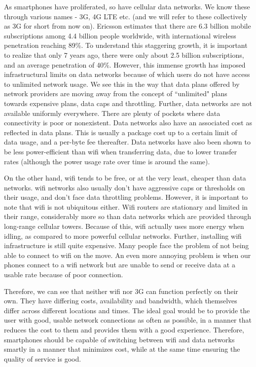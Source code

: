 \documentclass[12pt, fleqn]{article}
\begin{document}
As smartphones have proliferated,  so have cellular data networks. We know these through 
various names - 3G, 4G LTE etc. (and we will refer to these collectively as 3G for short from now on).
Ericsson estimates that there are 6.3 billion mobile subscriptions among 4.4 
billion people worldwide, with international wireless penetration reaching 89\%.\cite{ericsson-2013} To understand 
this staggering growth, it is important to realize that only 7 years ago, there 
were only about 2.5 billion subscriptions, and an average penetration of 
40\%.\cite{gsma-2006} However, this immense growth has imposed infrastructural limits on data networks because of 
which users do not have access to unlimited network usage. We see this in the 
way that data plans offered by network providers are moving away from the 
concept of ``unlimited" plans towards expensive plans, data caps and throttling.\cite{att-data-plans}\cite{verizon-data-plans}
Further, data networks are not available 
uniformly everywhere. There are plenty of pockets where data connectivity is 
poor or nonexistent.\cite{att-coverage}\cite{verizon-coverage} Data networks also have an associated cost as reflected in 
data plans. This is usually a package cost up to a certain limit of data usage, 
and a per-byte fee thereafter. Data networks have also been shown to be less 
power-efficient than wifi when transferring data, due to lower transfer rates (although the power usage
rate over time is around the same).\cite[p. 8]{lee-2012}\cite[p. 
249]{ananthanarayanan-2009}\cite[p. 280]{balasubramanian-2009}

On the other hand, wifi tends to be free, or at the very least, cheaper than 
data networks. wifi networks also usually don't have aggressive caps or thresholds 
on their usage, and don't face data throttling problems. However, it is important to 
note that wifi is not ubiquitous either. Wifi routers are stationary and limited 
in their range, considerably more so than data networks which are provided 
through long-range cellular towers. Because of this, wifi actually uses more energy
when idling, as compared to more powerful cellular networks.\cite[p. 280]{balasubramanian-2009}
\cite[p. 1]{rahmati-2007} Further, installing wifi infrastructure is still
quite expensive.\cite[p. 105]{raman-2007} Many people face the problem of not being 
able to connect to wifi on the move. An even more annoying problem is when our 
phones connect to a wifi network but are unable to send or receive data at a 
usable rate because of poor connection.

Therefore, we can see that neither wifi nor 3G can function perfectly on their 
own. They have differing costs, availability and bandwidth, which themselves 
differ across different locations and times. The ideal goal would be to provide 
the user with good, usable network connections as often as possible, in a 
manner that reduces the cost to them and provides them with a good experience.
Therefore, smartphones should be capable of switching 
between wifi and data networks smartly in a manner that minimizes cost, while at 
the same time ensuring the quality of service is good.
\end{document}
